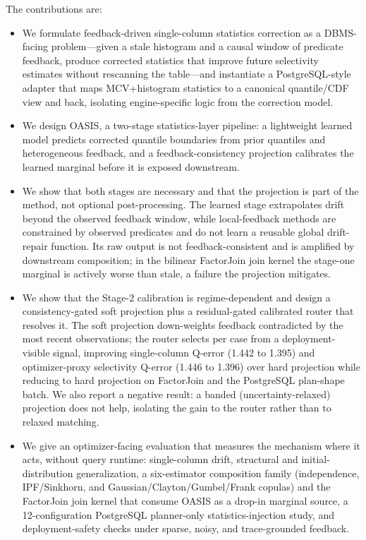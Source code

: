 \documentclass[preprint,12pt]{elsarticle}
\begin{document}
The contributions are:
\begin{itemize}
  \item We formulate feedback-driven single-column statistics correction as a
        DBMS-facing problem---given a stale histogram and a causal window of
        predicate feedback, produce corrected statistics that improve future
        selectivity estimates without rescanning the table---and instantiate a
        PostgreSQL-style adapter that maps MCV+histogram statistics to a
        canonical quantile/CDF view and back, isolating engine-specific logic
        from the correction model.
  \item We design OASIS, a two-stage statistics-layer pipeline: a lightweight
        learned model predicts corrected quantile boundaries from prior quantiles
        and heterogeneous feedback, and a feedback-consistency projection
        calibrates the learned marginal before it is exposed downstream.
  \item We show that both stages are necessary and that the projection is part of
        the method, not optional post-processing. The learned stage extrapolates
        drift beyond the observed feedback window, while local-feedback methods
        are constrained by observed predicates and do not learn a reusable global
        drift-repair function. Its raw output is not feedback-consistent and is
        amplified by downstream composition; in the bilinear FactorJoin join
        kernel the stage-one marginal is actively worse than stale, a failure
        the projection mitigates.
  \item We show that the Stage-2 calibration is regime-dependent and design a
        consistency-gated soft projection plus a residual-gated calibrated router
        that resolves it. The soft projection down-weights feedback contradicted
        by the most recent observations; the router selects per case from a
        deployment-visible signal, improving single-column Q-error (1.442 to
        1.395) and optimizer-proxy selectivity Q-error (1.446 to 1.396) over hard
        projection while reducing to hard projection on FactorJoin and the
        PostgreSQL plan-shape batch. We also report a negative result: a banded
        (uncertainty-relaxed) projection does not help, isolating the gain to the
        router rather than to relaxed matching.
  \item We give an optimizer-facing evaluation that measures the mechanism where
        it acts, without query runtime: single-column drift, structural and
        initial-distribution generalization, a six-estimator composition family
        (independence, IPF/Sinkhorn, and Gaussian/Clayton/Gumbel/Frank copulas)
        and the FactorJoin join kernel that consume OASIS as a drop-in marginal
        source, a 12-configuration PostgreSQL planner-only statistics-injection
        study, and deployment-safety checks under sparse, noisy, and
        trace-grounded feedback.
\end{itemize}
\end{document}
